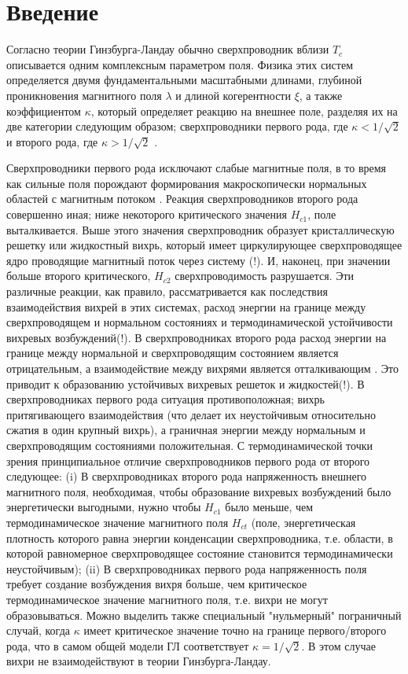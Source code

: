 \chapter{Введение}

Согласно теории Гинзбурга-Ландау обычно сверхпроводник вблизи \( T_c \) 
описывается одним комплексным параметром поля. Физика этих систем определяется 
двумя фундаментальными масштабными длинами, глубиной проникновения магнитного 
поля \( \lambda \) и длиной когерентности \( \xi \), а также коэффициентом 
\( \kappa \), который определяет реакцию на внешнее поле, разделяя их на две  
категории следующим образом; сверхпроводники первого рода, где 
\( \kappa < 1/\sqrt{2} \) и второго рода, где \( \kappa > 1/\sqrt{2} \) 
\cite{bib:3}.

Сверхпроводники первого рода исключают слабые магнитные поля, в то время как 
сильные поля порождают формирования макроскопически нормальных областей с 
магнитным потоком \cite{bib:4}. Реакция сверхпроводников второго рода 
совершенно иная; ниже некоторого критического значения \( H_{c1} \), поле 
выталкивается. Выше этого значения сверхпроводник образует кристаллическую 
решетку или жидкостный вихрь, который имеет циркулирующее сверхпроводящее 
ядро проводящие магнитный поток через систему (!). И, наконец, при значении 
больше второго критического, \( H_{c2} \) сверхпроводимость разрушается. Эти 
различные реакции, как правило, рассматривается как последствия взаимодействия 
вихрей в этих системах, расход энергии на границе между сверхпроводящем и 
нормальном состояниях и термодинамической устойчивости вихревых возбуждений(!). 
В сверхпроводниках второго рода расход энергии на границе между нормальной и 
сверхпроводящим состоянием является отрицательным, а взаимодействие между 
вихрями является отталкивающим \cite{bib:3}. Это приводит к образованию 
устойчивых вихревых решеток и жидкостей(!). В сверхпроводниках первого рода 
ситуация противоположная; вихрь притягивающего взаимодействия (что делает их 
неустойчивым относительно сжатия в один крупный вихрь), а граничная энергии 
между нормальным и сверхпроводящим состояниями положительная. С 
термодинамической точки зрения принципиальное отличие сверхпроводников первого 
рода от второго следующее: (i) В сверхпроводниках второго рода напряженность 
внешнего магнитного поля, необходимая, чтобы образование вихревых возбуждений 
было энергетически выгодными, нужно чтобы \( H_{c1} \) было меньше, чем 
термодинамическое значение магнитного поля \( H_{ct} \) (поле, энергетическая
плотность которого равна энергии конденсации сверхпроводника, т.е. области, в 
которой равномерное сверхпроводящее состояние становится термодинамически 
неустойчивым); (ii) В сверхпроводниках первого рода напряженность поля требует 
создание возбуждения вихря больше, чем критическое термодинамическое значение 
магнитного поля, т.е. вихри не могут образовываться. Можно выделить также 
специальный "нульмерный" пограничный случай, когда \( \kappa \) имеет 
критическое значение точно на границе первого/второго рода, что в самом общей 
модели ГЛ соответствует \( \kappa = 1/\sqrt{2} \). В этом случае вихри не 
взаимодействуют в теории Гинзбурга-Ландау.

